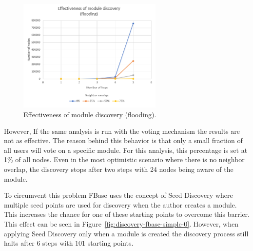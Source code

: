 \begin{figure}[ht!]
	\centering
	\includegraphics[width=0.64\textwidth]{images/evaluation-discovery-flooding.png}
	\caption{\label{fig:discovery-flooding} Effectiveness of module discovery (flooding).}
\end{figure}

\newpage

However, If the same analysis is run with the voting mechanism the results are not as effective. The reason behind this behavior is that only a small fraction of all users will vote on a specific module. For this analysis, this percentage is set at 1\% of all nodes. Even in the most optimistic scenario where there is no neighbor overlap, the discovery stops after two steps with 24 nodes being aware of the module.

To circumvent this problem FBase uses the concept of Seed Discovery where multiple seed points are used for discovery when the author creates a module. This increases the chance for one of these starting points to overcome this barrier. This effect can be seen in Figure~\ref{fig:discovery-fbase-simple-0}. However, when applying Seed Discovery only when a module is created the discovery process still halts after 6 steps with 101 starting points.

